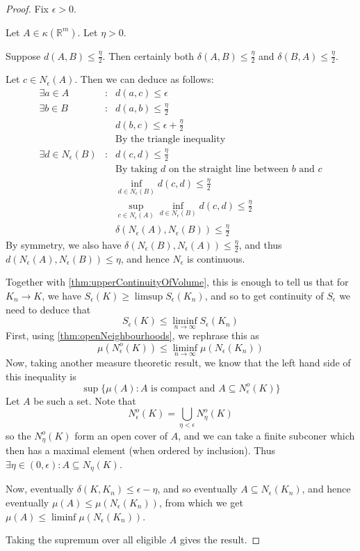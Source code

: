 \documentclass[a4paper,11pt]{article}
\newcommand{\bbR}{\mathbb{R}}
\begin{document}
\begin{proof}
Fix $\epsilon>0$.

Let $A\in\kappa(\bbR^m)$.  Let $\eta>0$.

Suppose $d(A,B)\leq\frac{\eta}{2}$.  Then certainly both
$\delta(A,B)\leq\frac{\eta}{2}$ and $\delta(B,A)\leq\frac{\eta}{2}$.

Let $c\in N_\epsilon(A)$.  Then we can deduce as follows:
%
\begin{eqnarray*}
\exists a\in A &:& d(a,c)\leq\epsilon \\
\exists b\in B &:& d(a,b)\leq\frac{\eta}{2} \\
&& d(b,c)\leq\epsilon+\frac{\eta}{2} \\
&& \textrm{By the triangle inequality} \\
\exists d\in N_\epsilon(B) &:& d(c,d)\leq\frac{\eta}{2} \\
&& \textrm{By taking $d$ on the straight line between $b$ and $c$} \\
&&\inf_{d\in N_\epsilon(B)}d(c,d)\leq\frac{\eta}{2} \\
&&\sup_{c\in N_\epsilon(A)}\inf_{d\in N_\epsilon(B)}d(c,d)\leq\frac{\eta}{2} \\
&&\delta(N_\epsilon(A),N_\epsilon(B))\leq\frac{\eta}{2}
\end{eqnarray*}
%
By symmetry, we also have
$\delta(N_\epsilon(B),N_\epsilon(A))\leq\frac{\eta}{2}$, and thus
$d(N_\epsilon(A),N_\epsilon(B))\leq\eta$, and hence $N_\epsilon$ is continuous.

Together with \ref{thm:upperContinuityOfVolume},
this is enough to tell us that for
$K_n\to K$, we have $S_\epsilon(K)\geq\limsup S_\epsilon(K_n)$, and so to get
continuity of $S_\epsilon$ we need to deduce that
\[
S_\epsilon(K)\leq\liminf_{n\to\infty} S_\epsilon(K_n)
\]
First, using \ref{thm:openNeighbourhoods}, we rephrase this as
\[
\mu(N_\epsilon^o(K))\leq\liminf_{n\to\infty}\mu(N_\epsilon(K_n))
\]
Now, taking another measure theoretic result, we know that the left hand side
of this inequality is
\[
\sup\{\mu(A):A\textrm{ is compact and }A\subseteq N_\epsilon^o(K)\}
\]
Let $A$ be such a set.  Note that
\[
N_\epsilon^o(K)=\bigcup_{\eta<\epsilon}N_\eta^o(K)
\]
so the $N_\eta^o(K)$ form an open cover of $A$, and we can take a finite
subconer which then has a maximal element (when ordered by inclusion).  Thus
$\exists\eta\in(0,\epsilon):A\subseteq N_\eta(K)$.

Now, eventually $\delta(K,K_n)\leq\epsilon-\eta$, and so eventually
$A\subseteq N_\epsilon(K_n)$, and hence eventually
$\mu(A)\leq\mu(N_\epsilon(K_n))$, from which we get
$\mu(A)\leq\liminf\mu(N_\epsilon(K_n))$.

Taking the supremum over all eligible $A$ gives the result.
\end{proof}
\end{document}
